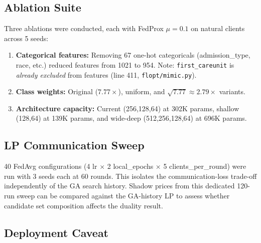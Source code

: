 \subsection{Ablation Suite}
\label{sec:ablation-suite}

Three ablations were conducted, each with FedProx $\mu=0.1$ on natural clients across 5 seeds:

\begin{enumerate}[nosep]
\item \textbf{Categorical features:} Removing 67 one-hot categoricals (admission\_type, race, etc.) reduced features from 1021 to 954. Note: \texttt{first\_careunit} is \emph{already excluded} from features (line 411, \texttt{flopt/mimic.py}).
\item \textbf{Class weights:} Original ($7.77\times$), uniform, and $\sqrt{7.77} \approx 2.79\times$ variants.
\item \textbf{Architecture capacity:} Current (256,128,64) at 302K params, shallow (128,64) at 139K params, and wide-deep (512,256,128,64) at 696K params.
\end{enumerate}

\subsection{LP Communication Sweep}
\label{sec:lp-sweep}

40 FedAvg configurations (4 lr $\times$ 2 local\_epochs $\times$ 5 clients\_per\_round) were run with 3 seeds each at 60 rounds. This isolates the communication-loss trade-off independently of the GA search history. Shadow prices from this dedicated 120-run sweep can be compared against the GA-history LP to assess whether candidate set composition affects the duality result.

\subsection{Deployment Caveat}
\label{sec:deploy-caveat}

\noindent{}
